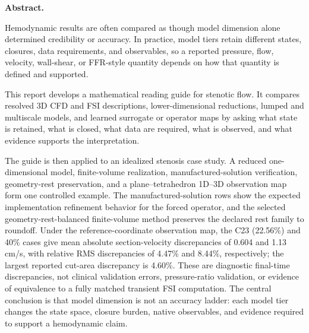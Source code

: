 \noindent\textbf{Abstract.}\par\smallskip
Hemodynamic results are often compared as though model dimension alone
determined credibility or accuracy. In practice, model tiers retain different
states, closures, data requirements, and observables, so a reported pressure,
flow, velocity, wall-shear, or FFR-style quantity depends on how that quantity is
defined and supported.

This report develops a mathematical reading guide for stenotic flow. It compares
resolved 3D CFD and FSI descriptions, lower-dimensional reductions, lumped and
multiscale models, and learned surrogate or operator maps by asking what state
is retained, what is closed, what data are required, what is observed, and what
evidence supports the interpretation.

The guide is then applied to an idealized stenosis case study. A reduced
one-dimensional model, finite-volume realization, manufactured-solution
verification, geometry-rest preservation, and a plane--tetrahedron 1D--3D
observation map form one controlled example. The manufactured-solution rows
show the expected implementation refinement behavior for the forced operator,
and the selected geometry-rest-balanced finite-volume method preserves the
declared rest family to roundoff. Under the reference-coordinate observation
map, the C23 (22.56\%) and 40\% cases give mean absolute section-velocity
discrepancies of 0.604 and 1.13 cm/s, with relative RMS discrepancies of 4.47\%
and 8.44\%, respectively; the largest reported cut-area discrepancy is 4.60\%.
These are diagnostic final-time discrepancies, not clinical validation errors,
pressure-ratio validation, or evidence of equivalence to a fully matched
transient FSI computation. The central conclusion is that model dimension is not
an accuracy ladder: each model tier changes the state space, closure burden,
native observables, and evidence required to support a hemodynamic claim.
